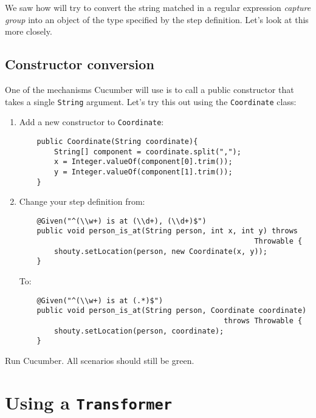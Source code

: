 We saw how \CUKE{} will try to convert the string matched in a regular expression \emph{capture group} into an object of the type specified by the step definition. Let’s look at this more closely.

\section*{Constructor conversion}

One of the mechanisms Cucumber will use is to call a public constructor that takes a single \texttt{String} argument. Let's try this out using the \texttt{Coordinate} class:

\begin{enumerate}
    \item Add a new constructor to \texttt{Coordinate}:

\begin{verbatim}
    public Coordinate(String coordinate){
        String[] component = coordinate.split(",");
        x = Integer.valueOf(component[0].trim());
        y = Integer.valueOf(component[1].trim());
    }
\end{verbatim}


    \item Change your step definition from:

\begin{verbatim}
    @Given("^(\\w+) is at (\\d+), (\\d+)$")
    public void person_is_at(String person, int x, int y) throws   
                                                      Throwable {
        shouty.setLocation(person, new Coordinate(x, y));
    }    
\end{verbatim}

To:

\begin{verbatim}
    @Given("^(\\w+) is at (.*)$")
    public void person_is_at(String person, Coordinate coordinate)   
                                               throws Throwable {
        shouty.setLocation(person, coordinate);
    }
\end{verbatim}
\end{enumerate}

Run Cucumber. All scenarios should still be green.



\chapter*{Using a \texttt{Transformer}}

